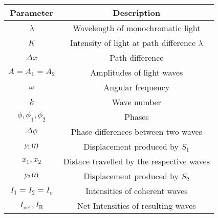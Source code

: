 \begin{tabular}{|c|c|}
\hline 
   \textbf{Parameter}  &\textbf{Description} \\
\hline
     $\lambda$ & Wavelength of monochromatic light\\
\hline
$K$ & Intensity of light at path difference $\lambda$ \\
\hline
$\Delta x$ & Path difference \\
\hline
$A=A_1=A_2$ & Amplitudes of light waves \\
\hline
$\omega$ & Angular frequency \\
\hline
$k$ & Wave number \\ 
\hline
$\phi, \phi_1,\phi_2$ & Phases  \\
\hline
$\Delta \phi $ & Phase differences between two waves \\
\hline
$y_1\left(t\right)$ & Displacement produced by $S_1$ \\
\hline
$x_1,x_2$ & Distace travelled by the respective waves \\
\hline
$y_2\left(t\right)$ & Displacement produced by $S_2$ \\
\hline
$I_1 = I_2 = I_o$ & Intensities of coherent waves \\
\hline
$I_{\text{net}},I_{\text{R}}$ & Net Intensities of resulting waves \\
\hline
\end{tabular}
